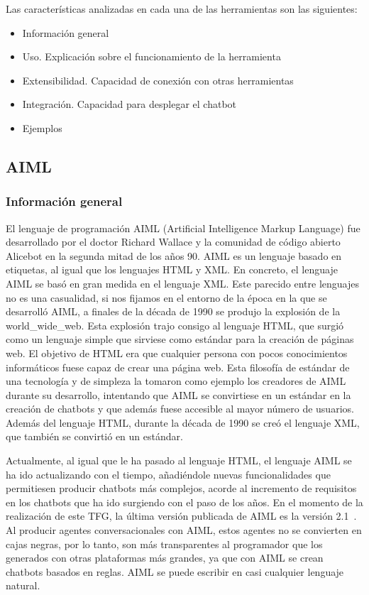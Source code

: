 Las características analizadas en cada una de las herramientas son las siguientes:

\begin{itemize}
\item Información general
\item Uso. Explicación sobre el funcionamiento de la herramienta
\item Extensibilidad. Capacidad de conexión con otras herramientas
\item Integración. Capacidad para desplegar el chatbot
\item Ejemplos
\end{itemize}


\subsection{AIML}

\subsubsection*{Información general}

El lenguaje de programación AIML (Artificial Intelligence Markup Language) fue desarrollado por el doctor Richard Wallace y la comunidad de código abierto Alicebot en la segunda mitad de los años 90. AIML es un lenguaje basado en etiquetas, al igual que los lenguajes HTML y XML. En concreto, el lenguaje AIML se basó en gran medida en el lenguaje XML. Este parecido entre lenguajes no es una casualidad, si nos fijamos en el entorno de la época en la que se desarrolló AIML, a finales de la década de 1990 se produjo la explosión de la \gls{world_wide_web}. Esta explosión trajo consigo al lenguaje HTML, que surgió como un lenguaje simple que sirviese como estándar para la creación de páginas web. El objetivo de HTML era que cualquier persona con pocos conocimientos informáticos fuese capaz de crear una página web. Esta filosofía de estándar de una tecnología y de simpleza la tomaron como ejemplo los creadores de AIML durante su desarrollo, intentando que AIML se convirtiese en un estándar en la creación de chatbots y que además fuese accesible al mayor número de usuarios. Además del lenguaje HTML, durante la década de 1990 se creó el lenguaje XML, que también se convirtió en un estándar.

Actualmente, al igual que le ha pasado al lenguaje HTML, el lenguaje AIML se ha ido actualizando con el tiempo, añadiéndole nuevas funcionalidades que permitiesen producir chatbots más complejos, acorde al incremento de requisitos en los chatbots que ha ido surgiendo con el paso de los años. En el momento de la realización de este TFG, la última versión publicada de AIML es la versión 2.1\ . Al producir agentes conversacionales con AIML, estos agentes no se convierten en cajas negras, por lo tanto, son más transparentes al programador que los generados con otras plataformas más grandes, ya que con AIML se crean chatbots basados en reglas. AIML se puede escribir en casi cualquier lenguaje natural.

